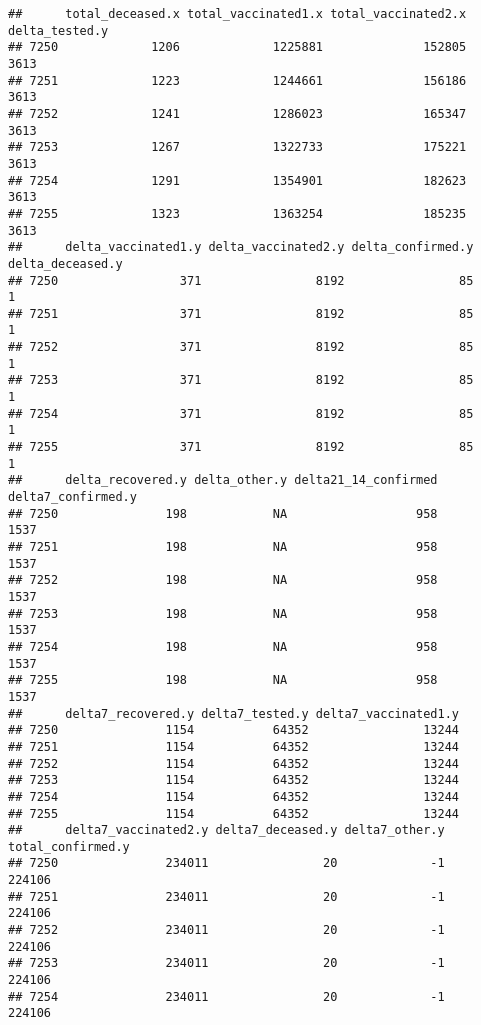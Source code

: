 \documentclass[
]{article}
\begin{document}
\begin{verbatim}
##      total_deceased.x total_vaccinated1.x total_vaccinated2.x delta_tested.y
## 7250             1206             1225881              152805           3613
## 7251             1223             1244661              156186           3613
## 7252             1241             1286023              165347           3613
## 7253             1267             1322733              175221           3613
## 7254             1291             1354901              182623           3613
## 7255             1323             1363254              185235           3613
##      delta_vaccinated1.y delta_vaccinated2.y delta_confirmed.y delta_deceased.y
## 7250                 371                8192                85                1
## 7251                 371                8192                85                1
## 7252                 371                8192                85                1
## 7253                 371                8192                85                1
## 7254                 371                8192                85                1
## 7255                 371                8192                85                1
##      delta_recovered.y delta_other.y delta21_14_confirmed delta7_confirmed.y
## 7250               198            NA                  958               1537
## 7251               198            NA                  958               1537
## 7252               198            NA                  958               1537
## 7253               198            NA                  958               1537
## 7254               198            NA                  958               1537
## 7255               198            NA                  958               1537
##      delta7_recovered.y delta7_tested.y delta7_vaccinated1.y
## 7250               1154           64352                13244
## 7251               1154           64352                13244
## 7252               1154           64352                13244
## 7253               1154           64352                13244
## 7254               1154           64352                13244
## 7255               1154           64352                13244
##      delta7_vaccinated2.y delta7_deceased.y delta7_other.y total_confirmed.y
## 7250               234011                20             -1            224106
## 7251               234011                20             -1            224106
## 7252               234011                20             -1            224106
## 7253               234011                20             -1            224106
## 7254               234011                20             -1            224106

\end{verbatim}
\end{document}
